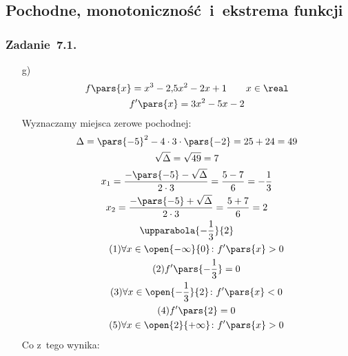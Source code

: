 \subsection*{Pochodne, monotoniczność i~ekstrema funkcji}
\subsubsection*{Zadanie~7.1.}
\begin{itemize}
    \item[g)]
        \begin{gather*}
            f\pars{x} = x^3 - 2{,}5x^2 - 2x + 1 \qquad x \in \real\\
            f'\pars{x} = 3x^2 - 5x - 2
        \end{gather*}
        Wyznaczamy miejsca zerowe pochodnej:
        \begin{gather*}
            \Delta = \pars{-5}^2 - 4 \cdot 3 \cdot \pars{-2}
                = 25 + 24
                = 49\\
            \sqrt{\Delta} = \sqrt{49} = 7\\
            x_1 = \frac{-\pars{-5} - \sqrt{\Delta}}{2 \cdot 3} = \frac{5 - 7}{6} = -\frac{1}{3}\\
            x_2 = \frac{-\pars{-5} + \sqrt{\Delta}}{2 \cdot 3} = \frac{5 + 7}{6} = 2\\
            \upparabola{-\frac{1}{3}}{2}\\
            \tag{\(1\)} \forall x \in \open{-\infty}{0}\colon f'\pars{x} > 0 \label{2020_10_20:7_1:g:first_increase}\\
            \tag{\(2\)} f'\pars{-\frac{1}{3}} = 0 \label{2020_10_20:7_1:g:first_zero}\\
            \tag{\(3\)} \forall x \in \open{-\frac{1}{3}}{2}\colon f'\pars{x} < 0 \label{2020_10_20:7_1:g:decrease}\\
            \tag{\(4\)} f'\pars{2} = 0 \label{2020_10_20:7_1:g:second_zero}\\
            \tag{\(5\)} \forall x \in \open{2}{+\infty}\colon f'\pars{x} > 0 \label{2020_10_20:7_1:g:second_increase}\\
        \end{gather*}
        Co z~tego wynika:
\end{itemize}
